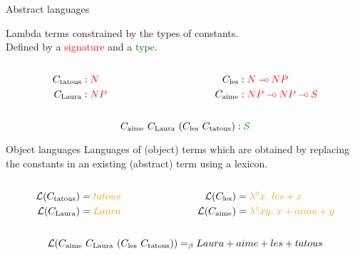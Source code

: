 \documentclass{beamer}
\def\limp {\mathbin{{-}\mkern-3.5mu{\circ}}}
\begin{document}
\begin{frame}
  \begin{block}{Abstract languages}

    Lambda terms constrained by the types of constants. \\ Defined by a
    \textcolor{red}{signature} and a \textcolor{darkgreen}{type}.

    \begin{columns}[t]
      \begin{column}{0.5\textwidth}
        \begin{align*}
          C_{\textrm{tatous}} &: \textcolor{red}{N} \\
          C_{\textrm{Laura}} &: \textcolor{red}{NP}
        \end{align*}
      \end{column}
      \begin{column}{0.5\textwidth}
        \begin{align*}
          \synt{les} &: \textcolor{red}{N \limp NP} \\
          \synt{aime} &: \textcolor{red}{NP \limp NP \limp S}
        \end{align*}
      \end{column}
    \end{columns}

    $$\synt{aime}\ \synt{Laura}\ (\synt{les}\ \synt{tatous}) :
    \textcolor{darkgreen}{S}$$
  \end{block}

  \begin{block}{Object languages}
    Languages of (object) terms which are obtained by replacing the
    constants in an existing (abstract) term using a \textcolor{darkgold}{lexicon}.

    \begin{columns}[t]
      \begin{column}{0.5\textwidth}
        \begin{align*}
          \mathcal{L}(\synt{tatous}) &= \textcolor{darkgold}{tatous} \\
          \mathcal{L}(\synt{Laura}) &= \textcolor{darkgold}{Laura}
        \end{align*}
      \end{column}
      \begin{column}{0.5\textwidth}
        \begin{align*}
          \mathcal{L}(\synt{les}) &= \textcolor{darkgold}{\lambda^{\circ} x.\ les + x} \\
          \mathcal{L}(\synt{aime}) &= \textcolor{darkgold}{\lambda^{\circ} x y.\ x + aime + y}
        \end{align*}
      \end{column}
    \end{columns}

    $$\mathcal{L}(\synt{aime}\ \synt{Laura}\ (\synt{les}\ \synt{tatous}))
    =_{\beta} Laura + aime + les + tatous$$
  \end{block}
\end{frame}
\end{document}
